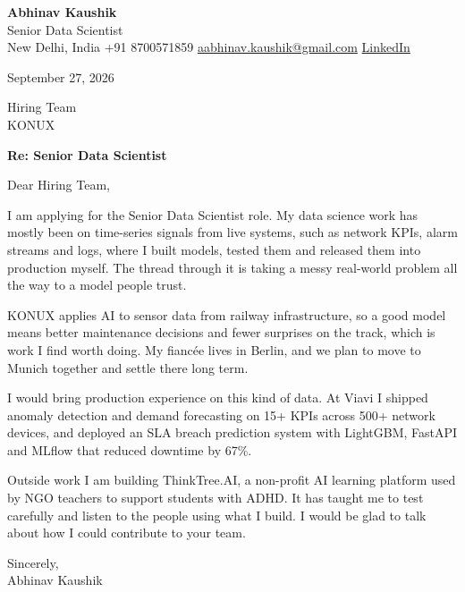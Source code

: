 \documentclass[11pt,a4paper]{article}
\begin{document}
{\Large\bfseries Abhinav Kaushik}\\
Senior Data Scientist\\
New Delhi, India \textbar{} +91 8700571859 \textbar{} \href{mailto:aabhinav.kaushik@gmail.com}{aabhinav.kaushik@gmail.com} \textbar{} \href{https://www.linkedin.com/in/abhinav-kaushik10/}{LinkedIn}  

September 27, 2026

Hiring Team\\
KONUX

\textbf{Re: Senior Data Scientist}

Dear Hiring Team,

I am applying for the Senior Data Scientist role. My data science work has mostly been on time-series signals from live systems, such as network KPIs, alarm streams and logs, where I built models, tested them and released them into production myself. The thread through it is taking a messy real-world problem all the way to a model people trust.

KONUX applies AI to sensor data from railway infrastructure, so a good model means better maintenance decisions and fewer surprises on the track, which is work I find worth doing. My fiancée lives in Berlin, and we plan to move to Munich together and settle there long term.

I would bring production experience on this kind of data. At Viavi I shipped anomaly detection and demand forecasting on 15+ KPIs across 500+ network devices, and deployed an SLA breach prediction system with LightGBM, FastAPI and MLflow that reduced downtime by 67\%.

Outside work I am building ThinkTree.AI, a non-profit AI learning platform used by NGO teachers to support students with ADHD. It has taught me to test carefully and listen to the people using what I build. I would be glad to talk about how I could contribute to your team.

Sincerely,\\[4pt]
Abhinav Kaushik
\end{document}
